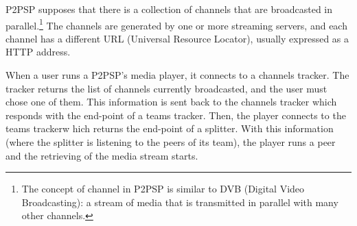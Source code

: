 \label{sec:CTS}
P2PSP supposes that there is a collection of channels that are
broadcasted in parallel.\footnote{The concept of channel in P2PSP is
  similar to DVB (Digital Video Broadcasting): a stream of media that
  is transmitted in parallel with many other channels.} The channels
are generated by one or more streaming servers, and each channel has a
different URL (Universal Resource Locator), usually expressed as a
HTTP address.

When a user runs a P2PSP's media player, it connects to a channels
tracker. The tracker returns the list of channels currently
broadcasted, and the user must chose one of them. This information is
sent back to the channels tracker which responds with the end-point of
a teams tracker. Then, the player connects to the teams trackerw hich
returns the end-point of a splitter. With this information (where the
splitter is listening to the peers of its team), the player runs a
peer and the retrieving of the media stream starts.
